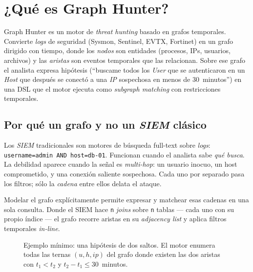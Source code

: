 \chapter{¿Qué es Graph Hunter?}
\label{cap:intro}

\begin{intuicion}
Graph Hunter es un motor de \emph{threat hunting} basado en grafos
temporales. Convierte \emph{logs} de seguridad (Sysmon, Sentinel,
EVTX, Fortinet) en un grafo dirigido con tiempo, donde los \emph{nodos}
son entidades (procesos, IPs, usuarios, archivos) y las \emph{aristas}
son eventos temporales que las relacionan. Sobre ese grafo el analista
expresa hipótesis (``buscame todos los \emph{User} que se autenticaron
en un \emph{Host} que después se conectó a una \emph{IP} sospechosa
en menos de 30~minutos'') en una DSL que el motor ejecuta como
\emph{subgraph matching} con restricciones temporales.
\end{intuicion}

\section{Por qué un grafo y no un \emph{SIEM} clásico}

Los \emph{SIEM} tradicionales son motores de búsqueda full-text sobre
\emph{logs}: \texttt{username=admin AND host=db-01}. Funcionan cuando
el analista sabe \emph{qué busca}. La debilidad aparece cuando la
señal es \emph{multi-hop}: un usuario inocuo, un host comprometido,
y una conexión saliente sospechosa. Cada uno por separado pasa los
filtros; sólo la \emph{cadena} entre ellos delata el ataque.

Modelar el grafo explícitamente permite expresar y matchear esas
cadenas en una sola consulta. Donde el SIEM hace \texttt{n}
\emph{joins} sobre \texttt{n} tablas — cada uno con su propio índice
— el grafo recorre aristas en su \emph{adjacency list} y aplica
filtros temporales \emph{in-line}.

\begin{figure}[H]
\centering
{}
\caption{Ejemplo mínimo: una hipótesis de dos saltos. El motor enumera
todas las ternas $(u, h, \mathit{ip})$ del grafo donde existen las dos
aristas con $t_1 < t_2$ y $t_2 - t_1 \leq 30$~minutos.}
\label{fig:intro-2hop}
\end{figure}

